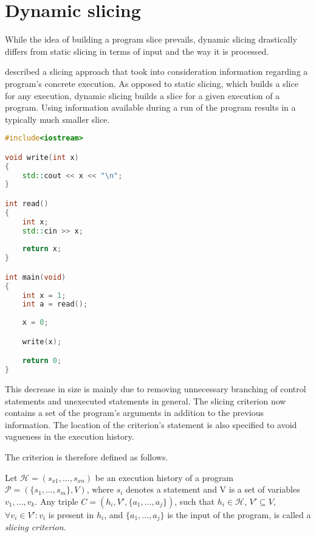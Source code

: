 \section{Dynamic slicing}

While the idea of building a program slice prevails, dynamic slicing 
drastically differs from static slicing in terms of input and the way
it is processed. 

\citet{Korel88} described a slicing approach that took into 
consideration information regarding a program's concrete execution. 
As opposed to static slicing, which builds a slice for any execution, 
dynamic slicing builds a slice for a given execution of a program. 
Using information available during a run of the program 
results in a typically much smaller slice.

\begin{lstlisting}[basicstyle=\tiny, caption=Dynamic slice of the simple
  branching program, frame=tlrb,
  language=C++, label={lst:dynamicslice}]
#include<iostream>

void write(int x)
{
	std::cout << x << "\n";
}

int read()
{
	int x;
	std::cin >> x;
	
	return x;
}

int main(void)
{
	int x = 1;
	int a = read();
		
	x = 0;

	write(x);

	return 0;
}  
\end{lstlisting}

This decrease in size is mainly due to removing unnecessary 
branching of control statements and unexecuted statements in general. 
The slicing criterion now contains a set of the program's 
arguments in addition to the previous information. 
The location of the criterion's statement is also specified to avoid 
vagueness in the execution history. 

The criterion is therefore defined as follows.

\begin{defn}\label{def02:6}
  Let $\mathcal{H} = (s_{x1},\dots,s_{xn})$ be an execution history of a program 
  $\mathcal{P} = (\{s_1,\dots,s_m\}, V)$, where $s_i$ denotes a statement
  and V is a set of variables $v_1,\dots,v_k$.
  Any triple $C = (h_i, V', \{a_1,\dots,a_j\})$, such that $h_i \in \mathcal{H}$,
  $V' \subseteq V$, $\forall v_i \in V': v_i$ is present in $h_i$,
  and $\{a_1,\dots,a_j\}$ is the input of the program,
  is called a \emph{slicing criterion}.
\end{defn}

